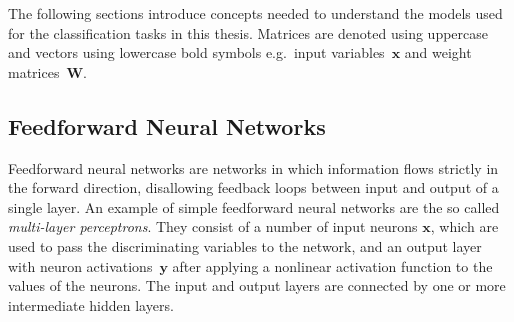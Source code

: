 The following sections introduce concepts needed to understand the models used
for the classification tasks in this thesis. Matrices are denoted using
uppercase and vectors using lowercase bold symbols e.g.\ input
variables~$\mathbf{x}$ and weight matrices~$\mathbf{W}$.

\subsection{Feedforward Neural Networks}
\label{sec:nn_feedforward}
Feedforward neural networks are networks in which information flows strictly in
the forward direction, disallowing feedback loops between input and output of a
single layer. An example of simple feedforward neural networks are the so called
\emph{multi-layer perceptrons}. They consist of a number of input neurons
$\mathbf{x}$, which are used to pass the discriminating variables to the
network, and an output layer with neuron activations~$\mathbf{y}$ after applying
a nonlinear activation function to the values of the neurons. The input and
output layers are connected by one or more intermediate hidden layers.
